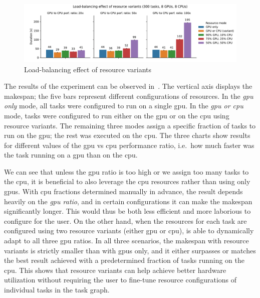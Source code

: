 \begin{figure}[h]
	\centering
	\includegraphics[width=\textwidth]{imgs/hq/charts/alternative-resources}
	\caption{Load-balancing effect of resource variants}
	\label{fig:hq-resource-variants}
\end{figure}

\vspace{1mm}The results of the experiment can be observed in~.
The vertical axis displays the makespan; the five bars represent different configurations of resources. In the
\emph{\gls{gpu} only} mode, all tasks were configured to run on a single
\gls{gpu}. In the \emph{\gls{gpu} or \gls{cpu}} mode, tasks were configured to run either
on the \gls{gpu} or on the \gls{cpu} using resource variants. The
remaining three modes assign a specific fraction of tasks to run on the \gls{gpu};
the rest was executed on the \gls{cpu}. The three charts show results for different
values of the \gls{gpu} vs \gls{cpu} performance ratio, i.e.\ how much
faster was the task running on a \gls{gpu} than on the \gls{cpu}.

We can see that unless the \gls{gpu} ratio is too high or we assign too many tasks to
the \gls{cpu}, it is beneficial to also leverage the \gls{cpu}
resources rather than using only \glspl{gpu}. With \gls{cpu} fractions
determined manually in advance, the result depends heavily on the \emph{\gls{gpu} ratio}, and in
certain configurations it can make the makespan significantly longer. This would thus be both less
efficient and more laborious to configure for the user. On the other hand, when the resources for
each task are configured using two resource variants (either \gls{gpu} or
\gls{cpu}), \hyperqueue{} is able to dynamically adapt to all three
\gls{gpu} ratios. In all three scenarios, the makespan with resource variants is
strictly smaller than with \glspl{gpu} only, and it either surpasses or matches the
best result achieved with a predetermined fraction of tasks running on the \gls{cpu}.
This shows that resource variants can help achieve better hardware utilization without requiring
the user to fine-tune resource configurations of individual tasks in the task graph.

